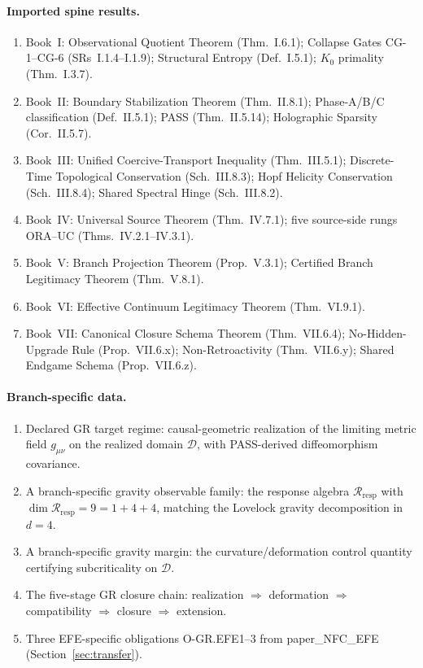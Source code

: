 \documentclass[12pt,oneside]{amsbook}
\theoremstyle{plain}
\theoremstyle{definition}
\theoremstyle{remark}
\begin{document}
\paragraph{Imported spine results.}
\begin{enumerate}[label=\textup{(\arabic*)}]
 \item Book~I: Observational Quotient Theorem (Thm.~I.6.1);
 Collapse Gates CG-1--CG-6 (SRs~I.1.4--I.1.9);
 Structural Entropy (Def.~I.5.1); $K_0$ primality
 (Thm.~I.3.7).
 \item Book~II: Boundary Stabilization Theorem (Thm.~II.8.1);
 Phase-A/B/C classification (Def.~II.5.1); PASS
 (Thm.~II.5.14); Holographic Sparsity (Cor.~II.5.7).
 \item Book~III: Unified Coercive-Transport Inequality
 (Thm.~III.5.1); Discrete-Time Topological Conservation
 (Sch.~III.8.3); Hopf Helicity Conservation
 (Sch.~III.8.4); Shared Spectral Hinge (Sch.~III.8.2).
 \item Book~IV: Universal Source Theorem (Thm.~IV.7.1);
 five source-side rungs ORA--UC (Thms.~IV.2.1--IV.3.1).
 \item Book~V: Branch Projection Theorem (Prop.~V.3.1);
 Certified Branch Legitimacy Theorem (Thm.~V.8.1).
 \item Book~VI: Effective Continuum Legitimacy Theorem
 (Thm.~VI.9.1).
 \item Book~VII: Canonical Closure Schema Theorem
 (Thm.~VII.6.4); No-Hidden-Upgrade Rule
 (Prop.~VII.6.x); Non-Retroactivity (Thm.~VII.6.y);
 Shared Endgame Schema (Prop.~VII.6.z).
\end{enumerate}

\paragraph{Branch-specific data.}
\begin{enumerate}[label=\textup{(\arabic*)}]
 \item Declared GR target regime: causal-geometric realization
 of the limiting metric field $g_{\mu\nu}$ on the realized
 domain $\mathcal{D}$, with PASS-derived diffeomorphism
 covariance.
 \item A branch-specific gravity observable family: the response
 algebra $\mathcal{R}_{\mathrm{resp}}$ with
 $\dim\mathcal{R}_{\mathrm{resp}} = 9 = 1+4+4$, matching
 the Lovelock gravity decomposition in $d=4$.
 \item A branch-specific gravity margin: the curvature/deformation
 control quantity certifying subcriticality on $\mathcal{D}$.
 \item The five-stage GR closure chain: realization $\Rightarrow$
 deformation $\Rightarrow$ compatibility $\Rightarrow$
 closure $\Rightarrow$ extension.
 \item Three EFE-specific obligations O-GR.EFE1--3 from
 paper\_NFC\_EFE (Section~\ref{sec:transfer}).
\end{enumerate}
\end{document}
